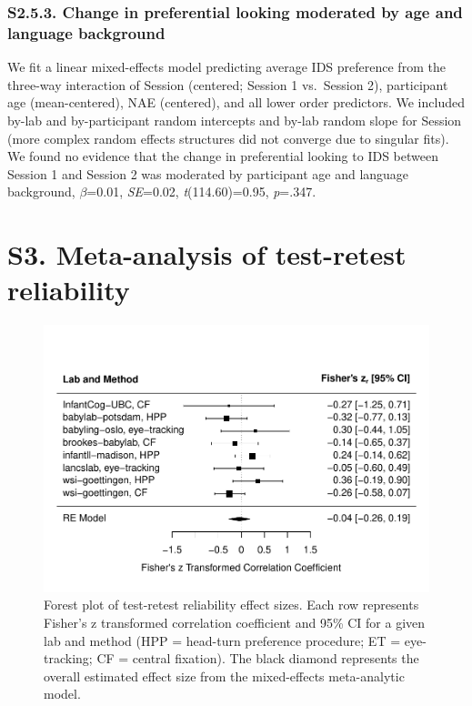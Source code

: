 \documentclass[
  man, donotrepeattitle,floatsintext]{apa6}
\begin{document}
\hypertarget{s2.5.3.-change-in-preferential-looking-moderated-by-age-and-language-background}{%
\subsubsection{S2.5.3. Change in preferential looking moderated by age and language background}\label{s2.5.3.-change-in-preferential-looking-moderated-by-age-and-language-background}}

We fit a linear mixed-effects model predicting average IDS preference from the three-way interaction of Session (centered; Session 1 vs.~Session 2), participant age (mean-centered), NAE (centered), and all lower order predictors.
We included by-lab and by-participant random intercepts and by-lab random slope for Session (more complex random effects structures did not converge due to singular fits).
We found no evidence that the change in preferential looking to IDS between Session 1 and Session 2 was moderated by participant age and language background, \(\beta\)=0.01, \emph{SE}=0.02, \emph{t}(114.60)=0.95, \emph{p}=.347.

\hypertarget{s3.-meta-analysis-of-test-retest-reliability}{%
\section{S3. Meta-analysis of test-retest reliability}\label{s3.-meta-analysis-of-test-retest-reliability}}

\begin{figure}
\centering
\includegraphics{MB1T_supplement_files/figure-latex/unnamed-chunk-20-1.pdf}
\caption{\label{fig:unnamed-chunk-20}Forest plot of test-retest reliability effect sizes. Each row represents Fisher's z transformed correlation coefficient and 95\% CI for a given lab and method (HPP = head-turn preference procedure; ET = eye-tracking; CF = central fixation). The black diamond represents the overall estimated effect size from the mixed-effects meta-analytic model.}
\end{figure}
\end{document}
